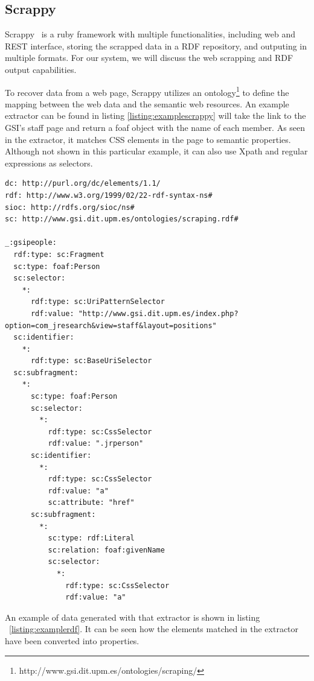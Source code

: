 
\subsection{Scrappy}
\label{subsec:scrappy}

Scrappy~\cite{villamor13} is a ruby framework with multiple functionalities, including web and REST interface, storing the scrapped data in a RDF repository, and outputing in multiple formats. For our system, we will discuss the web scrapping and RDF output capabilities.

To recover data from a web page, Scrappy utilizes an ontology\footnote{http://www.gsi.dit.upm.es/ontologies/scraping/} to define the mapping between the web data and the semantic web resources. An example extractor can be found in listing \ref{listing:examplescrappy} will take the link to the GSI's staff page and return a foaf object with the name of each member. As seen in the extractor, it matches CSS elements in the page to semantic properties. Although not shown in this particular example, it can also use Xpath and regular expressions as selectors.

\begin{center} 
  \begin{lstlisting}[language={}, captionpos=b, caption=Example extractor, label=listing:examplescrappy]   
dc: http://purl.org/dc/elements/1.1/
rdf: http://www.w3.org/1999/02/22-rdf-syntax-ns#
sioc: http://rdfs.org/sioc/ns#
sc: http://www.gsi.dit.upm.es/ontologies/scraping.rdf#

_:gsipeople:
  rdf:type: sc:Fragment
  sc:type: foaf:Person
  sc:selector:
    *:
      rdf:type: sc:UriPatternSelector
      rdf:value: "http://www.gsi.dit.upm.es/index.php?option=com_jresearch&view=staff&layout=positions"
  sc:identifier:
    *:
      rdf:type: sc:BaseUriSelector
  sc:subfragment:
    *:
      sc:type: foaf:Person
      sc:selector:
        *:
          rdf:type: sc:CssSelector
          rdf:value: ".jrperson"
      sc:identifier:
        *:
          rdf:type: sc:CssSelector
          rdf:value: "a"
          sc:attribute: "href"
      sc:subfragment:
        *:
          sc:type: rdf:Literal
          sc:relation: foaf:givenName
          sc:selector:
            *:
              rdf:type: sc:CssSelector
              rdf:value: "a"
  \end{lstlisting}
\end{center}

An example of data generated with that extractor is shown in listing ~\ref{listing:examplerdf}. It can be seen how the elements matched in the extractor have been converted into properties. 

